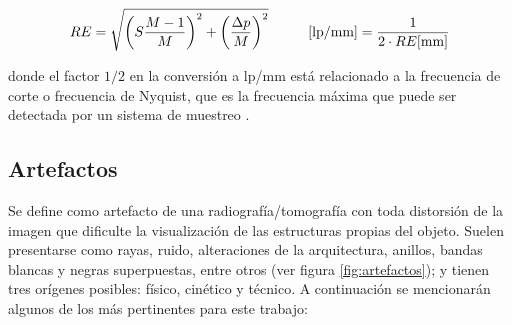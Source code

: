 \begin{equation}
    RE = \sqrt{\left(S\dfrac{M-1}{M}\right)^2 + \left(\frac{\Delta p}{M}\right)^2} 
    \hspace{10mm} [\text{lp/mm}] = \frac{1}{2\cdot RE[\text{mm}]} 
    \label{eq:res_espacial}
\end{equation}

\noindent donde el factor $1/2$ en la conversión a lp/mm está relacionado a la frecuencia de corte
o frecuencia de Nyquist, que es la frecuencia máxima que puede ser detectada por un 
sistema de muestreo \cite{Nyquist} \cite{Buzug2008}.

\subsection{Artefactos}

Se define como artefacto de una radiografía/tomografía con toda distorsión de la imagen
que dificulte la visualización de las estructuras propias del objeto. Suelen
presentarse como rayas, ruido, alteraciones de la arquitectura, anillos, bandas
blancas y negras superpuestas, entre otros (ver figura \ref{fig:artefactos}); y 
tienen tres orígenes posibles: físico, cinético y técnico. A continuación se 
mencionarán algunos de los más pertinentes para este trabajo:

